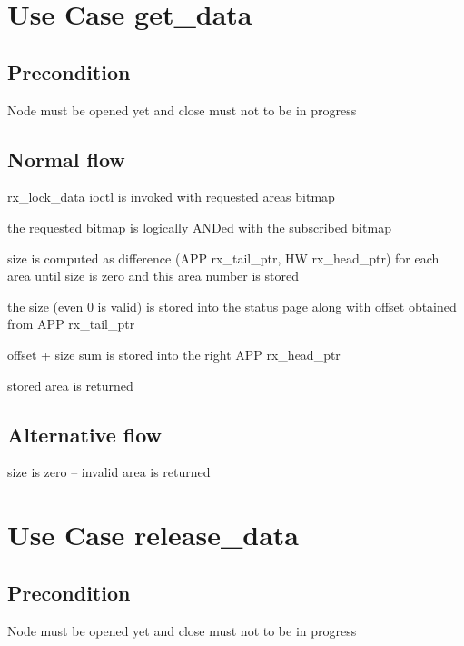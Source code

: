   \section{Use Case get\_data}
  \subsection{Precondition}
  Node must be opened yet and close must not to be in progress

  \subsection{Normal flow}
  \begin{CompactEnumerate}
    \item rx\_lock\_data ioctl is invoked with requested areas bitmap
    \item the requested bitmap is logically ANDed with the subscribed bitmap
    \item size is computed as difference (APP rx\_tail\_ptr, HW rx\_head\_ptr)
      for each area until size is zero and this area number is stored
    \item the size (even 0 is valid) is stored into the status page along with
      offset obtained from APP rx\_tail\_ptr
    \item offset + size sum is stored into the right APP rx\_head\_ptr
    \item stored area is returned
  \end{CompactEnumerate}

  \subsection{Alternative flow}
  \begin{CompactItemize}
    \item size is zero -- invalid area is returned
  \end{CompactItemize}

  \section{Use Case release\_data}

  \subsection{Precondition}
  Node must be opened yet and close must not to be in progress

